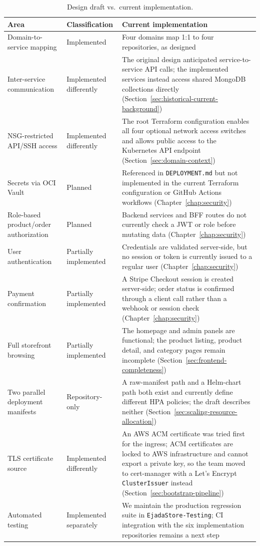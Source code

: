 \begin{table}[H]
\centering
\caption{Design draft vs.\ current implementation.}
\label{tab:draft-vs-impl}
\small
\begin{tabularx}{\textwidth}{>{\raggedright\arraybackslash}p{3.6cm}
                >{\raggedright\arraybackslash}p{2.6cm}
                >{\raggedright\arraybackslash}X}
\toprule
\textbf{Area} & \textbf{Classification} & \textbf{Current implementation} \\
\midrule
Domain-to-service mapping & Implemented & Four domains map 1:1 to four repositories, as designed \\
Inter-service communication & Implemented differently & The original design anticipated service-to-service API calls; the implemented services instead access shared MongoDB collections directly (Section~\ref{sec:historical-current-background}) \\
NSG-restricted API/SSH access & Implemented differently & The root Terraform configuration enables all four optional network access switches and allows public access to the Kubernetes API endpoint (Section~\ref{sec:domain-context}) \\
Secrets via OCI Vault & Planned & Referenced in \texttt{DEPLOYMENT.md} but not implemented in the current Terraform configuration or GitHub Actions workflows (Chapter~\ref{chap:security}) \\
Role-based product/order authorization & Planned & Backend services and BFF routes do not currently check a JWT or role before mutating data (Chapter~\ref{chap:security}) \\
User authentication & Partially implemented & Credentials are validated server-side, but no session or token is currently issued to a regular user (Chapter~\ref{chap:security}) \\
Payment confirmation & Partially implemented & A Stripe Checkout session is created server-side; order status is confirmed through a client call rather than a webhook or session check (Chapter~\ref{chap:security}) \\
Full storefront browsing & Partially implemented & The homepage and admin panels are functional; the product listing, product detail, and category pages remain incomplete (Section~\ref{sec:frontend-completeness}) \\
Two parallel deployment manifests & Repository-only & A raw-manifest path and a Helm-chart path both exist and currently define different HPA policies; the draft describes neither (Section~\ref{sec:scaling-resource-allocation}) \\
TLS certificate source & Implemented differently & An AWS ACM certificate was tried first for the ingress; ACM certificates are locked to AWS infrastructure and cannot export a private key, so the team moved to cert-manager with a Let's Encrypt \texttt{ClusterIssuer} instead (Section~\ref{sec:bootstrap-pipeline}) \\
Automated testing & Implemented separately & We maintain the production regression suite in \texttt{EjadaStore-Testing}; CI integration with the six implementation repositories remains a next step \\
\bottomrule
\end{tabularx}
\end{table}
